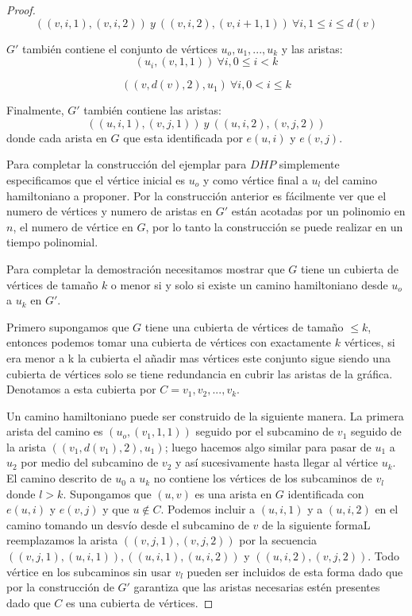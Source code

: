 \documentclass{article}
\begin{document}
\begin{proof}
  \begin{equation*}
    ((v,i,1),(v,i,2))\ y\ ((v,i,2),(v,i+1,1))\ \forall i, 1 \leqslant i \leqslant d(v)
  \end{equation*}

  $G'$ también contiene el conjunto de vértices ${ u_o, u_1, ..., u_k }$ y las aristas:
  \begin{equation*}
    (u_i, (v,1,1))\ \forall i, 0 \leqslant i < k
  \end{equation*}

  \begin{equation*}
    ((v,d(v),2),u_1)\ \forall i, 0 < i \leqslant k
  \end{equation*}
  
  Finalmente, $G'$ también contiene las aristas:
  \begin{equation*}
    ((u,i,1),(v,j,1))\ y\ ((u,i,2),(v,j,2))
  \end{equation*}
  donde cada arista en $G$ que esta identificada por $e(u,i)$ y $e(v,j)$.

  Para completar la construcción del ejemplar para $DHP$ simplemente especificamos que el vértice inicial es $u_o$ y como vértice final a $u_l$ del camino hamiltoniano a proponer. Por la construcción anterior es fácilmente  ver que el numero de vértices y numero de aristas en $G'$ están acotadas por un polinomio en $n$, el numero de vértice en $G$, por lo tanto la construcción se puede realizar en un tiempo polinomial.

  Para completar la demostración necesitamos mostrar que $G$ tiene un cubierta de vértices de tamaño $k$ o menor si y solo si existe un camino hamiltoniano desde $u_o$ a $u_k$ en $G'$.

  Primero supongamos que $G$ tiene una cubierta de vértices de tamaño $\leqslant k$, entonces podemos tomar una cubierta de vértices con exactamente $k$ vértices, si era menor a k la cubierta el añadir mas vértices este conjunto sigue siendo una cubierta de vértices solo se tiene redundancia en cubrir las aristas de la gráfica. Denotamos a esta cubierta por $C = {v_1, v_2, ..., v_k}$.

  Un camino hamiltoniano puede ser construido de la siguiente manera. La primera arista del camino es $(u_o, (v_1,1,1))$ seguido por el subcamino de $v_1$ seguido de la arista $((v_1, d(v_1),2), u_1)$; luego hacemos algo similar para pasar de $u_1$ a $u_2$ por medio del subcamino de $v_2$ y así sucesivamente hasta llegar al vértice $u_k$. El camino descrito de $u_0$ a $u_k$ no contiene los vértices de los subcaminos de $v_l$ donde $l > k$. Supongamos que $(u,v)$ es una arista en $G$ identificada con $e(u,i)$ y $e(v,j)$ y que $u \notin C$. Podemos incluir a $(u,i,1)$ y a $(u,i,2)$ en el camino tomando un desvío desde el subcamino de $v$ de la siguiente formaL reemplazamos la arista  $((v,j,1),(v,j,2))$ por la secuencia $((v,j,1),(u,i,1)),((u,i,1),(u,i,2))$ y $((u,i,2),(v,j,2))$. Todo vértice en los subcaminos sin usar $v_l$ pueden ser incluidos de esta forma dado que por la construcción de $G'$ garantiza que las aristas necesarias estén presentes dado que $C$ es una cubierta de vértices.


\end{proof}
\end{document}
